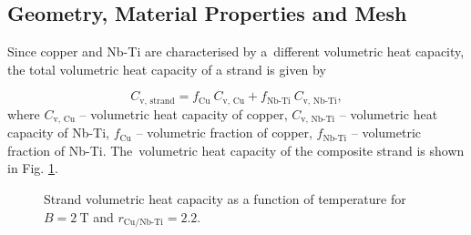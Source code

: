 
\subsection{Geometry, Material Properties and Mesh}

Since copper and Nb-Ti are characterised by a~different volumetric heat capacity, the total volumetric heat capacity of a strand is given by

\begin{equation}
    C_\text{v, strand} = f_\text{Cu} ~ C_\text{v, Cu} + f_\text{Nb-Ti} ~ C_\text{v, Nb-Ti},
    \label{eqn: cv_equiv}
\end{equation}
where $C_\text{v, Cu}$ -- volumetric heat capacity of copper, $C_\text{v, Nb-Ti}$ -- volumetric heat capacity of Nb-Ti, $f_\text{Cu}$ -- volumetric fraction of copper, $f_\text{Nb-Ti}$ -- volumetric fraction of Nb-Ti. The~volumetric heat capacity of the composite strand is shown in Fig. \ref{fig:eq_wind_cp}.

\begin{figure}[H]
\centering
    \caption{Strand volumetric heat capacity as a function of temperature for $B=2~\text{T}$ and $r_\text{Cu/Nb-Ti}=2.2$.}
    \label{fig:eq_wind_cp}
\end{figure}

